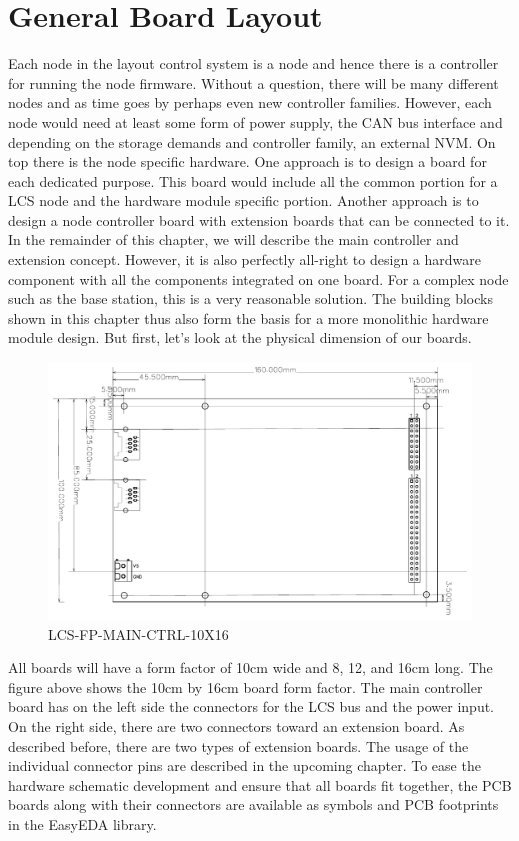 \section{General Board Layout}

Each node in the layout control system is a node and hence there is a controller for running the node firmware. Without a question, there will be many different nodes and as time goes by perhaps even new controller families. However, each node would need at least some form of power supply, the CAN bus interface and depending on the storage demands and controller family, an external NVM. On top there is the node specific hardware. One approach is to design a board for each dedicated purpose. This board would include all the common portion for a LCS node and the hardware module specific portion. Another approach is to design a node controller board with extension boards that can be connected to it. In the remainder of this chapter, we will describe the main controller and extension concept. However, it is also perfectly all-right to design a hardware component with all the components integrated on one board. For a complex node such as the base station, this is a very reasonable solution. The building blocks shown in this chapter thus also form the basis for a more monolithic hardware module design. But first, let's look at the physical dimension of our boards.

\begin{figure}[htbp]
    \centering
    \includegraphics[page=1, scale=0.7]{./Figures/LCS-FP-MAIN-CTRL-10X16.pdf}
    \caption{LCS-FP-MAIN-CTRL-10X16}
\end{figure}

All boards will have a form factor of 10cm wide and 8, 12, and 16cm long. The figure above shows the 10cm by 16cm board form factor. The main controller board has on the left side the connectors for the LCS bus and the power input. On the right side, there are two connectors toward an extension board. As described before, there are two types of extension boards. The usage of the individual connector pins are described in the upcoming chapter. To ease the hardware schematic development and ensure that all boards fit together, the PCB boards along with their connectors are available as symbols and PCB footprints in the EasyEDA library.

